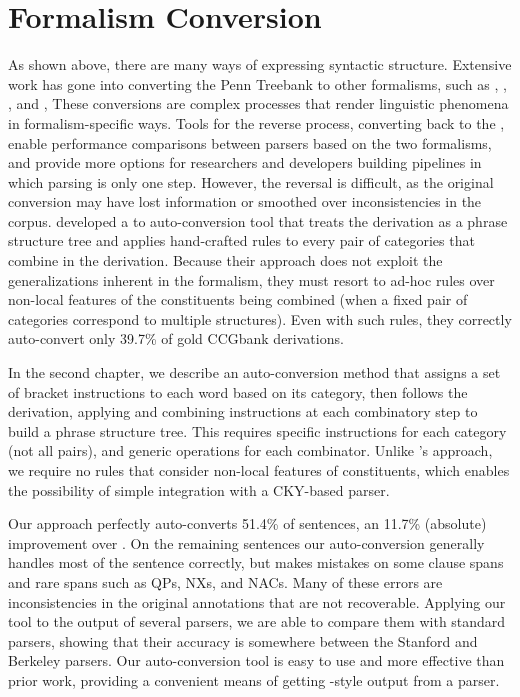 \section{Formalism Conversion}

As shown above, there are many ways of expressing syntactic structure.
Extensive work has gone into converting the Penn Treebank to other formalisms, such as \hpsg \parencite{Miyao-Ninomiya-Tsujii:2004}, \lfg \parencite{Cahill-etal:2008}, \ltag \parencite{Xia:1999}, and \ccg \parencite{CCGBank},
These conversions are complex processes that render linguistic phenomena in formalism-specific ways.
Tools for the reverse process, converting back to the \ptb, enable performance comparisons between parsers based on the two formalisms, and provide more options for researchers and developers building pipelines in which parsing is only one step.
However, the reversal is difficult, as the original conversion may have lost information or smoothed over inconsistencies in the corpus.
\textcite{Clark-Curran:2009} developed a \ccg to \ptb auto-conversion tool that treats the \ccg derivation as a phrase structure tree and applies hand-crafted rules to every pair of categories that combine in the derivation.
Because their approach does not exploit the generalizations inherent in the \ccg formalism, they must resort to ad-hoc rules over non-local features of the \ccg constituents being combined (when a fixed pair of \ccg categories correspond to multiple \ptb structures).
Even with such rules, they correctly auto-convert only 39.7\% of gold CCGbank derivations.

In the second chapter, we describe an auto-conversion method that assigns a set of bracket instructions to each word based on its \ccg category, then follows the \ccg derivation, applying and combining instructions at each combinatory step to build a phrase structure tree.
This requires specific instructions for each category (not all pairs), and generic operations for each combinator.
Unlike \textcite{Clark-Curran:2009}'s approach, we require no rules that consider non-local features of constituents, which enables the possibility of simple integration with a CKY-based parser.

Our approach perfectly auto-converts 51.4\% of sentences, an 11.7\% (absolute) improvement over \textcite{Clark-Curran:2009}.
On the remaining sentences our auto-conversion generally handles most of the sentence correctly, but makes mistakes on some clause spans and rare spans such as QPs, NXs, and NACs.
Many of these errors are inconsistencies in the original \ptb annotations that are not recoverable.
Applying our tool to the output of several \ccg parsers, we are able to compare them with standard \ptb parsers, showing that their accuracy is somewhere between the Stanford and Berkeley parsers.
Our auto-conversion tool is easy to use and more effective than prior work, providing a convenient means of getting \ptb-style output from a \ccg parser.

